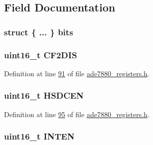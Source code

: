 \subsection{Field Documentation}
\hypertarget{a00024_ae79b83e21321a2fd7febe825d5a4e903}{
\subsubsection[{bits}]{\setlength{\rightskip}{0pt plus 5cm}struct \{ ... \}  bits}}\label{dc/de2/a00024_ae79b83e21321a2fd7febe825d5a4e903}
\hypertarget{a00024_ab4c2cafa34b0206975dfbffd56985e68}{
\subsubsection[{C\-F2\-D\-I\-S}]{\setlength{\rightskip}{0pt plus 5cm}uint16\-\_\-t C\-F2\-D\-I\-S}}\label{dc/de2/a00024_ab4c2cafa34b0206975dfbffd56985e68}


Definition at line \hyperlink{a00036_source_l00091}{91} of file \hyperlink{a00036_source}{ade7880\-\_\-registers.\-h}.

\hypertarget{a00024_a1a23d978426d0caed94827cc17de287d}{
\subsubsection[{H\-S\-D\-C\-E\-N}]{\setlength{\rightskip}{0pt plus 5cm}uint16\-\_\-t H\-S\-D\-C\-E\-N}}\label{dc/de2/a00024_a1a23d978426d0caed94827cc17de287d}


Definition at line \hyperlink{a00036_source_l00095}{95} of file \hyperlink{a00036_source}{ade7880\-\_\-registers.\-h}.

\hypertarget{a00024_a953a6f60e45da737e090044cd0d6db3e}{
\subsubsection[{I\-N\-T\-E\-N}]{\setlength{\rightskip}{0pt plus 5cm}uint16\-\_\-t I\-N\-T\-E\-N}}\label{dc/de2/a00024_a953a6f60e45da737e090044cd0d6db3e}


